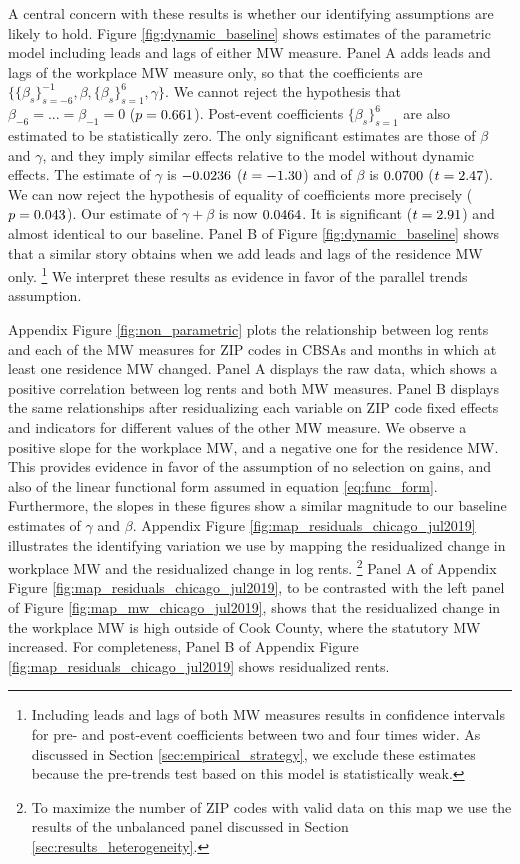 A central concern with these results is whether our identifying assumptions are 
likely to hold.
Figure \ref{fig:dynamic_baseline} shows estimates of the parametric model 
including leads and lags of either MW measure.
Panel A adds leads and lags of the workplace MW measure only, so that
the coefficients are
$\{\{\beta_s\}_{s=-6}^{-1},\beta,\{\beta_s\}_{s=1}^6,\gamma\}$.
We cannot reject the hypothesis that $\beta_{-6}=...=\beta_{-1}=0$ 
($p = 0.661$).
Post-event coefficients $\{\beta_s\}_{s=1}^6$ are also estimated to be 
statistically zero.
The only significant estimates are those of $\beta$ and $\gamma$, and they imply
similar effects relative to the model without dynamic effects.
The estimate of $\gamma$ is $-0.0236$ 
($t=-1.30$) and of $\beta$ is $0.0700$ 
($t=2.47$).
We can now reject the hypothesis of equality of coefficients more precisely 
($p = 0.043$).
Our estimate of $\gamma+\beta$ is now $0.0464$.
It is significant ($t=2.91$) and almost identical to our 
baseline.
Panel B of Figure \ref{fig:dynamic_baseline} shows that a similar story 
obtains when we add leads and lags of the residence MW only.%
\footnote{Including leads and lags of both MW measures results in confidence 
intervals for pre- and post-event coefficients between two and four times wider.
As discussed in Section \ref{sec:empirical_strategy}, we exclude these estimates 
because the pre-trends test based on this model is statistically weak.}
We interpret these results as evidence in favor of the parallel trends assumption.

Appendix Figure \ref{fig:non_parametric} plots the relationship between 
log rents and each of the MW measures for ZIP codes in CBSAs and months 
in which at least one residence MW changed.
Panel A displays the raw data, which shows a positive correlation between log 
rents and both MW measures.
Panel B displays the same relationships after residualizing each variable on 
ZIP code fixed effects and indicators for different values of the other MW 
measure.
We observe a positive slope for the workplace MW, and a negative one for
the residence MW.
This provides evidence in favor of the assumption of no selection on gains, and
also of the linear functional form assumed in equation \eqref{eq:func_form}. 
Furthermore, the slopes in these figures show a similar magnitude to our 
baseline estimates of $\gamma$ and $\beta$.
Appendix Figure \ref{fig:map_residuals_chicago_jul2019} illustrates the 
identifying variation we use by mapping the residualized change in workplace MW 
and the residualized change in log rents.%
\footnote{To maximize the number of ZIP codes with valid data on this map we
use the results of the unbalanced panel discussed in Section 
\ref{sec:results_heterogeneity}.}
Panel A of Appendix Figure \ref{fig:map_residuals_chicago_jul2019}, to be 
contrasted with the left panel of Figure \ref{fig:map_mw_chicago_jul2019}, 
shows that the residualized change in the workplace MW is high outside of Cook 
County, where the statutory MW increased.
For completeness, Panel B of Appendix Figure 
\ref{fig:map_residuals_chicago_jul2019} shows residualized rents.

